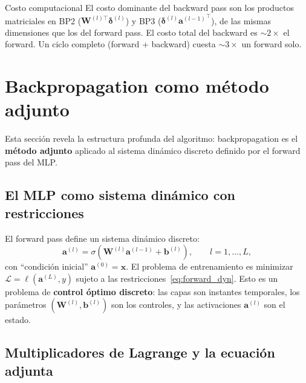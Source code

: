 \begin{observacion}{Costo computacional}
El costo dominante del backward pass son los productos matriciales en BP2
($\bm{W}^{(l)\top}\bm{\delta}^{(l)}$) y BP3
($\bm{\delta}^{(l)}{\bm{a}^{(l-1)}}^\top$), de las mismas dimensiones que
los del forward pass. El costo total del backward es $\sim 2\times$ el
forward. Un ciclo completo (forward + backward) cuesta $\sim 3\times$ un
forward solo.
\end{observacion}

\section{Backpropagation como método adjunto}
\label{sec:adjunto}


Esta sección revela la estructura profunda del algoritmo: backpropagation
es el \textbf{método adjunto} aplicado al sistema dinámico discreto
definido por el forward pass del MLP.

\subsection{El MLP como sistema dinámico con restricciones}
\label{subsec:mlp_dinamico}

El forward pass define un sistema dinámico discreto:
\begin{equation}
  \bm{a}^{(l)} = \sigma(\bm{W}^{(l)}\bm{a}^{(l-1)}+\bm{b}^{(l)}),
  \qquad l = 1, \ldots, L,
  \label{eq:forward_dyn}
\end{equation}
con ``condición inicial'' $\bm{a}^{(0)} = \bm{x}$. El problema de
entrenamiento es minimizar
$\mathcal{L} = \ell(\bm{a}^{(L)}, y)$ sujeto a las
restricciones~\eqref{eq:forward_dyn}. Esto es un problema de
\textbf{control óptimo discreto}: las capas son instantes temporales, los
parámetros $(\bm{W}^{(l)}, \bm{b}^{(l)})$ son los controles, y las
activaciones $\bm{a}^{(l)}$ son el estado.

\subsection{Multiplicadores de Lagrange y la ecuación adjunta}
\label{subsec:lagrange}

